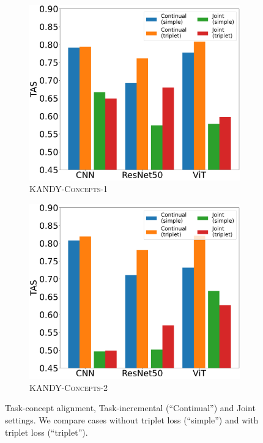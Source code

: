 \begin{figure}[!t]
	\centering
	\begin{subfigure}{.49\textwidth}
	\centering
	\includegraphics[width=\textwidth]{imgs/cem/KANDY_1-TAS_ablation.pdf}
	\caption{\textsc{KANDY-Concepts-1}}
	\end{subfigure}
	\begin{subfigure}{.49\textwidth}
		\centering
	\includegraphics[width=\textwidth]{imgs/cem/KANDY_2-TAS_ablation.pdf}
	\caption{\textsc{KANDY-Concepts-2}}
	\end{subfigure}
	\caption[Concept alignment on \textsc{KANDY-Concepts}]{%
		Task-concept alignment, Task-incremental (``Continual'') and Joint settings. We compare cases without triplet loss (``simple'') and with triplet loss (``triplet'').
	}
	\label{cem:fig:tas-ablation}
\end{figure}


